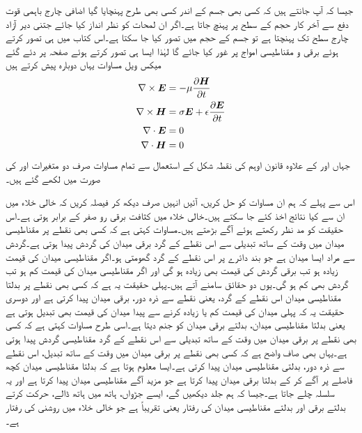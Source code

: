 جیسا کہ آپ جانتے ہیں کہ کسی بھی جسم کے اندر کسی بھی طرح پہنچایا گیا اضافی چارج باہمی قوت دفع سے آخر کار حجم کے سطح پر پہنچ جاتا ہے۔اگر ان لمحات کو نظر انداز کیا جائے جتنی دیر آزاد چارج سطح تک پہنچتا ہے تو جسم کے حجم میں  تصور کیا جا سکتا ہے۔اس کتاب میں  ہی تصور کرتے ہوئے برقی و مقناطیسی امواج پر غور کیا جائے گا لہٰذا ایسا ہی تصور کرتے ہوئے صفحہ  پر دئے گئے میکس ویل مساوات یہاں دوبارہ پیش کرتے ہیں
\begin{align}
\nabla \times {\ensuremath{{\boldsymbol{E}}}}&=-\mu \frac{\partial {\ensuremath{{\boldsymbol{H}}}}}{\partial t}  \label{مساوات_موج_میکس_ویل_خالی_خلاء_الف}\\
\nabla \times {\ensuremath{{\boldsymbol{H}}}}&=\sigma {\ensuremath{{\boldsymbol{E}}}}+\epsilon \frac{\partial {\ensuremath{{\boldsymbol{E}}}}}{\partial t}  \label{مساوات_موج_میکس_ویل_خالی_خلاء_ب}\\
\nabla \cdot {\ensuremath{{\boldsymbol{E}}}}&=0 \label{مساوات_موج_میکس_ویل_خالی_خلاء_پ}\\
\nabla \cdot {\ensuremath{{\boldsymbol{H}}}}&=0  \label{مساوات_موج_میکس_ویل_خالی_خلاء_ت}
\end{align}
جہاں  اور  کے علاوہ قانون اوہم کی نقطہ شکل  کے  استعمال سے تمام مساوات صرف دو متغیرات  اور  کی صورت میں لکھے گئے ہیں۔

اس سے پہلے کہ ہم ان مساوات کو حل کریں، آئیں انہیں صرف دیکھ کر فیصلہ کریں کہ خالی خلاء میں ان سے  کیا نتائج اخذ کئے جا سکتے ہیں۔خالی خلاء میں کثافت برقی رو   صفر کے برابر ہوتی ہے۔اس حقیقت کو مد نظر رکھتے ہوئے آگے بڑھتے ہیں۔مساوات  کہتی ہے کہ کسی بھی نقطے پر مقناطیسی میدان میں وقت کے ساتھ تبدیلی سے اس نقطے کے گرد برقی میدان کی گردش پیدا ہوتی ہے۔گردش سے مراد ایسا میدان ہے جو بند دائرے پر اس نقطے کے گرد گھومتی ہو۔اگر مقناطیسی میدان کی قیمت زیادہ ہو تب برقی گردش کی قیمت بھی زیادہ ہو گی اور اگر مقناطیسی میدان کی قیمت کم ہو تب گردش بھی کم ہو گی۔یوں دو حقائق سامنے آتے ہیں۔پہلی حقیقت یہ ہے کہ کسی بھی نقطے پر بدلتا مقناطیسی میدان اس نقطے کے گرد، یعنی نقطے سے ذرہ دور، برقی میدان پیدا کرتی ہے اور دوسری حقیقت یہ کہ پہلی میدان کی قیمت کم یا زیادہ کرنے سے پیدا میدان کی قیمت بھی تبدیل ہوتی ہے یعنی بدلتا مقناطیسی میدان، بدلتے برقی میدان کو جنم دیتا ہے۔اسی طرح مساوات  کہتی ہے کہ کسی بھی نقطے پر برقی میدان میں وقت کے ساتھ تبدیلی سے اس نقطے کے گرد مقناطیسی گردش پیدا ہوتی ہے۔یہاں بھی صاف واضح ہے کہ کسی بھی نقطے پر برقی میدان میں وقت کے ساتھ تبدیل، اس نقطے سے ذرہ دور، بدلتی مقناطیسی میدان پیدا کرتی ہے۔ایسا معلوم ہوتا ہے کہ بدلتا مقناطیسی میدان کچھ فاصلے پر آگے کر کے بدلتا برقی میدان پیدا کرتا ہے جو مزید آگے مقناطیسی میدان پیدا کرتا ہے اور یہ سلسلہ چلے جاتا ہے۔جیسا کہ ہم جلد دیکھیں گے، ایسے جڑواں، ہاتھ میں ہاتھ ڈالے، حرکت کرتے بدلتے برقی اور بدلتے مقناطیسی میدان کی رفتار  یعنی تقریباً  ہے جو خالی خلاء میں روشنی کی رفتار ہے۔

